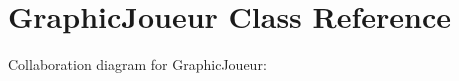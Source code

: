 \hypertarget{classGraphicJoueur}{}\section{Graphic\+Joueur Class Reference}
\label{classGraphicJoueur}


Collaboration diagram for Graphic\+Joueur\+:
